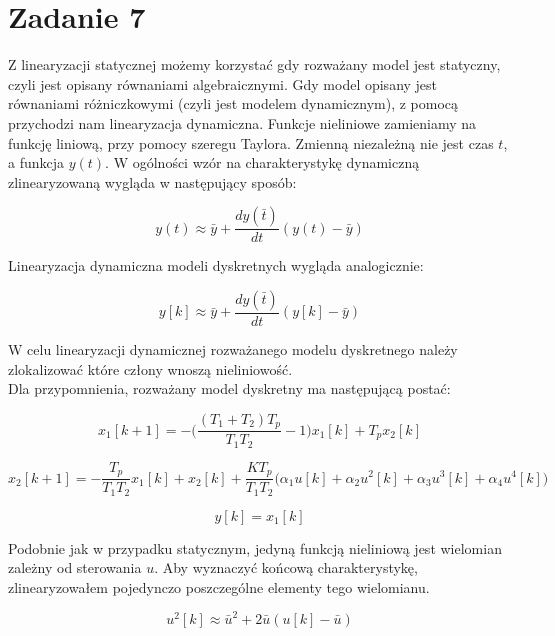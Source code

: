 \documentclass[a4paper,titlepage,11pt,floatssmall]{mwrep}
\begin{document}
\section{Zadanie 7}
Z linearyzacji statycznej możemy korzystać gdy rozważany model jest statyczny, czyli jest opisany równaniami algebraicznymi. Gdy model opisany jest równaniami różniczkowymi (czyli jest modelem dynamicznym), z pomocą przychodzi nam linearyzacja dynamiczna. Funkcje nieliniowe zamieniamy na funkcję liniową, przy pomocy szeregu Taylora. Zmienną niezależną nie jest czas $t$, a funkcja $y(t)$.
W ogólności wzór na charakterystykę dynamiczną zlinearyzowaną wygląda w następujący sposób:


\begin{equation*}
y(t) \approx \bar{y} + \frac{dy(\bar{t})}{dt}(y(t) - \bar{y})
\end{equation*}

Linearyzacja dynamiczna modeli dyskretnych wygląda analogicznie:

\begin{equation*}
y[k] \approx \bar{y} + \frac{dy(\bar{t})}{dt}(y[k] - \bar{y})
\end{equation*}

W celu linearyzacji dynamicznej rozważanego modelu dyskretnego należy zlokalizować które człony wnoszą nieliniowość. \\

\indent{}Dla przypomnienia, rozważany model dyskretny ma następującą postać:

\begin{equation*}
x_1[k+1] = -\bigg(\frac{(T_1 + T_2)T_p}{T_1 T_2} - 1\bigg)x_1[k] + T_p x_2[k] 
\end{equation*}

\begin{equation*}
x_2[k+1] = -\frac{T_p}{T_1 T_2}x_1[k] + x_2[k] + \frac{K T_p}{T_1 T_2}\big( \alpha_1 u[k] + \alpha_2 u^2[k] + \alpha_3 u^3[k] + \alpha_4 u^4[k]\big)
\end{equation*}

\begin{equation*}
y[k] = x_1[k]
\end{equation*}

Podobnie jak w przypadku statycznym, jedyną funkcją nieliniową jest wielomian zależny od sterowania $u$. Aby wyznaczyć końcową charakterystykę, zlinearyzowałem pojedynczo poszczególne elementy tego wielomianu. 

\begin{equation*}
u^2[k] \approx \bar{u}^2  + 2\bar{u}(u[k] - \bar{u})
\end{equation*}
\end{document}
